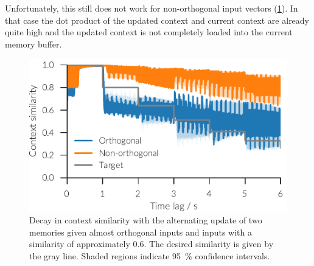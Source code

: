 Unfortunately, this still does not work for non-orthogonal input vectors (\cref{fig:amb}).
In that case the dot product of the updated context and current context are already quite high and the updated context is not completely loaded into the current memory buffer.
\begin{figure}
    \centering
    \includegraphics{figures/context-analysis/amb}
    \caption[Decay in context similarity with the alternating update of two memories.]{
        Decay in context similarity with the alternating update of two memories given almost orthogonal inputs and inputs with a similarity of approximately \num{0.6}.
        The desired similarity is given by the gray line. Shaded regions indicate \SI{95}{\percent} confidence intervals.}\label{fig:amb}
\end{figure}


